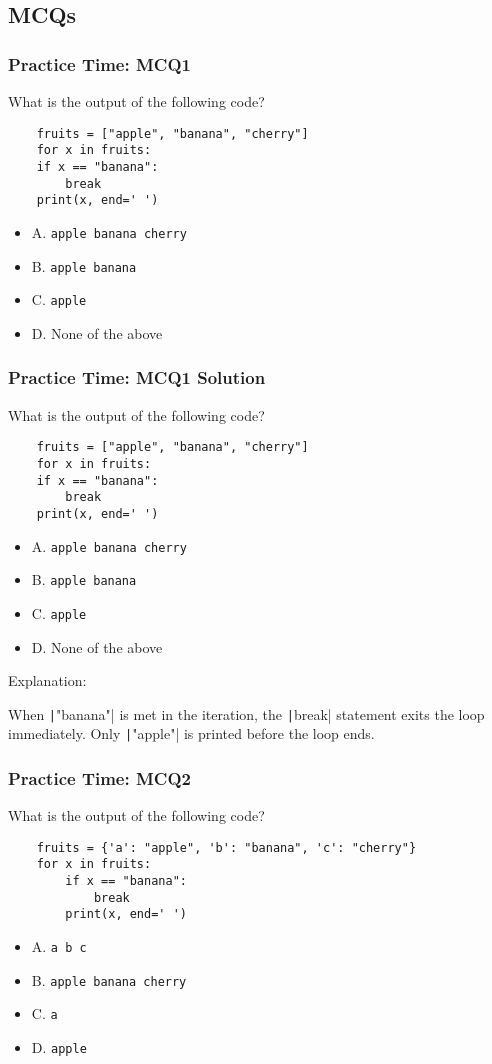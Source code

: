 \documentclass{beamer}
\newcommand{\python}[1]{\texttt|#1|}
\begin{document}
\subsection{MCQs}
\begin{frame}[fragile]
    \frametitle{Practice Time: MCQ1}
    What is the output of the following code?
    \begin{verbatim}
    fruits = ["apple", "banana", "cherry"]
    for x in fruits:
    if x == "banana":
        break
    print(x, end=' ')    
    \end{verbatim}
    \begin{itemize}
        \item A. \texttt{apple banana cherry}
        \item B. \texttt{apple banana}
        \item C. \texttt{apple }
        \item D. None of the above
    \end{itemize}
\end{frame}
\begin{frame}[fragile]
    \frametitle{Practice Time: MCQ1 Solution}
    What is the output of the following code?

    \begin{verbatim}
    fruits = ["apple", "banana", "cherry"]
    for x in fruits:
    if x == "banana":
        break
    print(x, end=' ')    
    \end{verbatim}

    \begin{itemize}
        \item A. \texttt{apple banana cherry}
        \item B. \texttt{apple banana}
        \item \alert{C. \texttt{apple }}
        \item D. None of the above
    \end{itemize}

    Explanation:

    When \python{"banana"} is met in the iteration,
    the \python{break} statement exits the loop immediately.
    Only \python{"apple"} is printed before the loop ends.
\end{frame}
\begin{frame}[fragile]
    \frametitle{Practice Time: MCQ2}
    What is the output of the following code?

    \begin{verbatim}
    fruits = {'a': "apple", 'b': "banana", 'c': "cherry"}
    for x in fruits:
        if x == "banana":
            break
        print(x, end=' ')
    \end{verbatim}

    \begin{itemize}
        \item A. \texttt{a b c }
        \item B. \texttt{apple banana cherry }
        \item C. \texttt{a }
        \item D. \texttt{apple }
    \end{itemize}
\end{frame}
\end{document}

